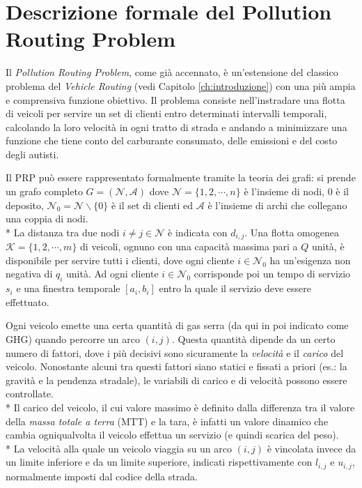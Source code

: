 \chapter{Descrizione formale del Pollution Routing Problem}\label{ch:cap_2}

	Il \emph{Pollution Routing Problem}, come già accennato, è un’estensione del classico problema del \emph{Vehicle Routing} (vedi Capitolo \ref{ch:introduzione}) con una più ampia e comprensiva funzione obiettivo. Il problema consiste nell’instradare una flotta di veicoli per servire un set di clienti entro determinati intervalli temporali, calcolando la loro velocità in ogni tratto di strada e andando a minimizzare una funzione che tiene conto del carburante consumato, delle emissioni e del costo degli autisti. 

	Il PRP può essere rappresentato formalmente tramite la teoria dei grafi: si prende un grafo completo $G = (\mathcal{N},\mathcal{A})$ dove $\mathcal{N} = \{1, 2, \cdots, n\}$ è l'insieme di nodi, $0$ è il deposito, $\mathcal{N}_0 = \mathcal{N} \backslash \{0\}$ è il set di clienti ed $\mathcal{A}$ è l'insieme di archi che collegano una coppia di nodi. \\*
	La distanza tra due nodi $i \neq j \in \mathcal{N}$  è indicata con $d_{i,j}$. Una flotta omogenea $\mathcal{K} = \{1, 2, \cdots, m\}$ di veicoli, ognuno con una capacità massima pari a $Q$ unità, è disponibile per servire tutti i clienti, dove ogni cliente $i \in \mathcal{N}_0$ ha un’esigenza non negativa di $q_{i}$ unità. Ad ogni cliente $i \in \mathcal{N}_0$ corrisponde poi un tempo di servizio $s_{i}$ e una finestra temporale $[a_{i},b_{i}]$ entro la quale il servizio deve essere effettuato. 

	Ogni veicolo emette una certa quantità di gas serra (da qui in poi indicato come GHG) quando percorre un arco $(i,j)$. Questa quantità dipende da un certo numero di fattori, dove i più decisivi sono sicuramente la \emph{velocità} e il \emph{carico} del veicolo. Nonostante alcuni tra questi fattori siano statici e fissati a priori (es.: la gravità e la pendenza stradale), le variabili di carico e di velocità possono essere controllate. \\*
	Il carico del veicolo, il cui valore massimo è definito dalla differenza tra il valore della \emph{massa totale a terra} (MTT) e la tara, è infatti un valore dinamico che cambia ogniqualvolta il veicolo effettua un servizio (e quindi scarica del peso). \\*
	La velocità alla quale un veicolo viaggia su un arco $(i,j)$ è vincolata invece da un limite inferiore e da un limite superiore, indicati rispettivamente con $l_{i,j}$ e $u_{i,j}$, normalmente imposti dal codice della strada.

